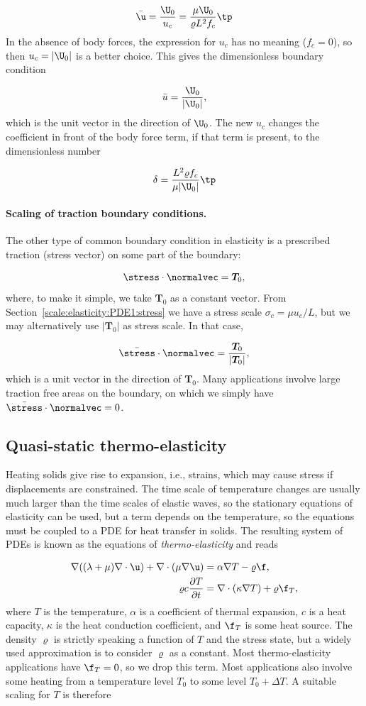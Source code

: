 \documentclass[graybox,envcountchap,sectrefs,final]{svmonodo}
\begin{document}
\[ \bar\u = \frac{\U_0}{u_c} = \frac{\mu \U_0}{\varrho L^2f_c}\tp\]
In the absence of body forces, the expression for $u_c$ has no
meaning ($f_c=0$), so then $u_c = |\U_0|$ is a better choice.
This gives the dimensionless boundary condition

\[ \bar u = \frac{\U_0}{|\U_0|},\]
which is the unit vector in the direction of $\U_0$. The new $u_c$
changes the coefficient in front of the body force term, if that term
is present, to the dimensionless number

\[ \delta = \frac{L^2\varrho f_c}{\mu |\U_0|}\tp\]

\paragraph{Scaling of traction boundary conditions.}
The other type of common boundary condition in elasticity is a
prescribed traction (stress vector) on some part of the boundary:

\[ \stress\cdot\normalvec = \bm{T}_0,\]
where, to make it simple, we take $\bm{T}_0$ as a constant vector.
From Section~\ref{scale:elasticity:PDE1:stress} we have a stress scale
$\sigma_c = \mu u_c/L$, but we may alternatively use $|\bm{T}_0|$
as stress scale. In that case,

\[ \bar\stress\cdot\normalvec = \frac{\bm{T}_0}{|\bm{T}_0|},\]
which is a unit vector in the direction of $\bm{T}_0$.
Many applications involve large traction free areas on the boundary, on
which we simply have $\bar\stress\cdot\normalvec = 0$.


\subsection{Quasi-static thermo-elasticity}
\label{scale:elasticity:thermo}


Heating solids give rise to expansion, i.e., strains, which may cause
stress if displacements are constrained. The time scale of temperature
changes are usually much larger than the time scales of elastic waves,
so the stationary equations of elasticity can be used, but a term
depends on the temperature, so the equations must be coupled to
a PDE for heat transfer in solids. The resulting system of PDEs is
known as the equations of \emph{thermo-elasticity} and reads

\begin{align}
\nabla((\lambda + \mu)\nabla\cdot\u) + \nabla\cdot(\mu\nabla\u) &= \alpha\nabla T -\varrho\f,\\ 
\varrho c \frac{\partial T}{\partial t} &= \nabla\cdot(\kappa\nabla T) + \varrho \f_T,
\end{align}
where $T$ is the temperature, $\alpha$ is a coefficient of thermal expansion,
$c$ is a heat capacity, $\kappa$ is the heat conduction coefficient,
and $\f_T$ is some heat source. The density $\varrho$ is strictly speaking
a function of $T$ and the stress state, but a widely used approximation
is to consider $\varrho$ as a constant.
Most thermo-elasticity applications have
$\f_T=0$, so we drop this term. Most applications also involve some heating
from a temperature level $T_0$ to some level $T_0 +\Delta T$.
A suitable scaling for $T$ is therefore
\end{document}
